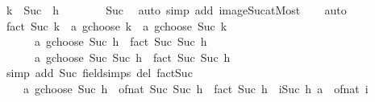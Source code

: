 \begin{isabellebody}
\ {\isachardoublequoteopen}{\isacharbraceleft}{\kern0pt}{}{\isachardot}{\kern0pt}{\isachardot}{\kern0pt}k{\isacharbraceright}{\kern0pt}\ {\isacharequal}{\kern0pt}\ Suc\ {\isacharbackquote}{\kern0pt}\ {\isacharbraceleft}{\kern0pt}{}{\isachardot}{\kern0pt}{\isachardot}{\kern0pt}h{\isacharbraceright}{\kern0pt}{\isachardoublequoteclose}\isanewline
\ \ \ \ \ \ \isamarkupfalse%
\ Suc\ \isamarkupfalse%
\ {\isacharparenleft}{\kern0pt}auto\ simp\ add{\isacharcolon}{\kern0pt}\ image{\isacharunderscore}{\kern0pt}Suc{\isacharunderscore}{\kern0pt}atMost{\isacharparenright}{\kern0pt}\isanewline
\ \ \isamarkupfalse%
\ auto\isanewline
\ \ \isamarkupfalse%
\ {\isachardoublequoteopen}fact\ {\isacharparenleft}{\kern0pt}Suc\ k{\isacharparenright}{\kern0pt}\ {\isacharasterisk}{\kern0pt}\ {\isacharparenleft}{\kern0pt}a\ gchoose\ k\ {\isacharplus}{\kern0pt}\ {\isacharparenleft}{\kern0pt}a\ gchoose\ {\isacharparenleft}{\kern0pt}Suc\ k{\isacharparenright}{\kern0pt}{\isacharparenright}{\kern0pt}{\isacharparenright}{\kern0pt}\ {\isacharequal}{\kern0pt}\isanewline
\ \ \ \ \ \ {\isacharparenleft}{\kern0pt}a\ gchoose\ Suc\ h{\isacharparenright}{\kern0pt}\ {\isacharasterisk}{\kern0pt}\ {\isacharparenleft}{\kern0pt}fact\ {\isacharparenleft}{\kern0pt}Suc\ {\isacharparenleft}{\kern0pt}Suc\ h{\isacharparenright}{\kern0pt}{\isacharparenright}{\kern0pt}{\isacharparenright}{\kern0pt}\ {\isacharplus}{\kern0pt}\isanewline
\ \ \ \ \ \ {\isacharparenleft}{\kern0pt}a\ gchoose\ Suc\ {\isacharparenleft}{\kern0pt}Suc\ h{\isacharparenright}{\kern0pt}{\isacharparenright}{\kern0pt}\ {\isacharasterisk}{\kern0pt}\ {\isacharparenleft}{\kern0pt}fact\ {\isacharparenleft}{\kern0pt}Suc\ {\isacharparenleft}{\kern0pt}Suc\ h{\isacharparenright}{\kern0pt}{\isacharparenright}{\kern0pt}{\isacharparenright}{\kern0pt}{\isachardoublequoteclose}\isanewline
\ \ \ \ \isamarkupfalse%
\ {\isacharparenleft}{\kern0pt}simp\ add{\isacharcolon}{\kern0pt}\ Suc\ field{\isacharunderscore}{\kern0pt}simps\ del{\isacharcolon}{\kern0pt}\ fact{\isacharunderscore}{\kern0pt}Suc{\isacharparenright}{\kern0pt}\isanewline
\ \ \isamarkupfalse%
\ \isamarkupfalse%
\ {\isachardoublequoteopen}{\isasymdots}\ {\isacharequal}{\kern0pt}\isanewline
\ \ \ \ {\isacharparenleft}{\kern0pt}a\ gchoose\ Suc\ h{\isacharparenright}{\kern0pt}\ {\isacharasterisk}{\kern0pt}\ of{\isacharunderscore}{\kern0pt}nat\ {\isacharparenleft}{\kern0pt}Suc\ {\isacharparenleft}{\kern0pt}Suc\ h{\isacharparenright}{\kern0pt}\ {\isacharasterisk}{\kern0pt}\ fact\ {\isacharparenleft}{\kern0pt}Suc\ h{\isacharparenright}{\kern0pt}{\isacharparenright}{\kern0pt}\ {\isacharplus}{\kern0pt}\ {\isacharparenleft}{\kern0pt}{\isasymProd}i{\isacharequal}{\kern0pt}{}{\isachardot}{\kern0pt}{\isachardot}{\kern0pt}Suc\ h{\isachardot}{\kern0pt}\ a\ {\isacharminus}{\kern0pt}\ of{\isacharunderscore}{\kern0pt}nat\ i{\isacharparenright}{\kern0pt}{\isachardoublequoteclose}\isanewline

\end{isabellebody}
